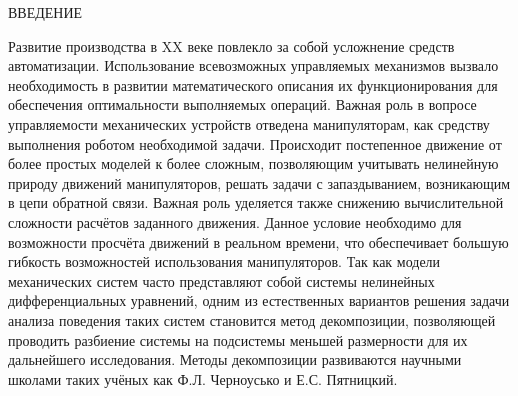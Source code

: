 {\centerline{ {\sc ВВЕДЕНИЕ }} \label{prefix}
	Развитие производства в XX веке повлекло за собой усложнение средств автоматизации. Использование всевозможных управляемых механизмов вызвало необходимость в развитии математического описания их функционирования для обеспечения оптимальности выполняемых операций. Важная роль в вопросе управляемости механических устройств отведена манипуляторам, как средству выполнения роботом необходимой задачи. Происходит постепенное движение от более простых моделей к более сложным, позволяющим учитывать нелинейную природу движений манипуляторов, решать задачи с запаздыванием, возникающим в цепи обратной связи.
	Важная роль уделяется также снижению вычислительной сложности расчётов заданного движения. Данное условие необходимо для возможности просчёта движений в реальном времени, что обеспечивает большую гибкость возможностей использования манипуляторов.
	Так как модели механических систем часто представляют собой системы нелинейных дифференциальных уравнений, одним из естественных вариантов решения задачи анализа поведения таких систем становится метод декомпозиции, позволяющей проводить разбиение системы на подсистемы меньшей размерности для их дальнейшего исследования. Методы декомпозиции развиваются научными школами таких учёных как Ф.Л. Черноусько и Е.С. Пятницкий. 
}
